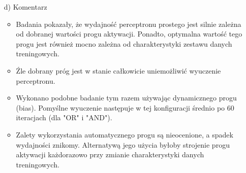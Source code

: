 \documentclass[17pt]{article}
\begin{document}
\begin{enumerate}
\item[d)] Komentarz

\begin{itemize}
\item Badania pokazały, że wydajność perceptronu prostego jest silnie zależna od dobranej wartości progu aktywacji. Ponadto, optymalna wartość tego progu jest również mocno zależna od charakterystyki zestawu danych treningowych. 
\item Źle dobrany próg jest w stanie całkowicie uniemożliwić wyuczenie perceptronu.
\item Wykonano podobne badanie tym razem używając dynamicznego progu (bias). Pomyślne wyuczenie następuje w tej konfiguracji średnio po 60 iteracjach (dla "OR" i "AND").
\item Zalety wykorzystania automatycznego progu są nieocenione, a spadek wydajności znikomy. Alternatywą jego użycia byłoby strojenie progu aktywacji każdorazowo przy zmianie charakterystyki danych treningowych.
\end{itemize}

\end{enumerate}
\end{document}
